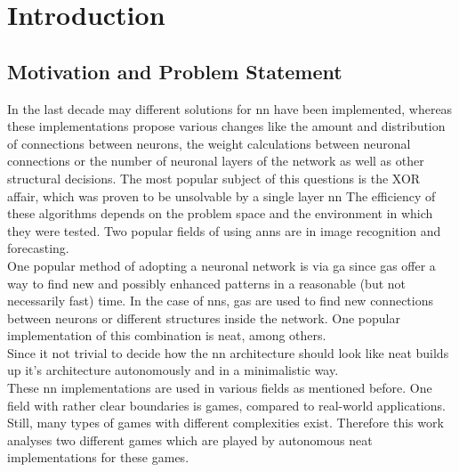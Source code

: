 %
\chapter{Introduction}
\label{sec:intro}


\section{Motivation and Problem Statement}
\label{sec:intro:motivation}
In the last decade may different solutions for \gls{nn} have been implemented, whereas these implementations propose various changes like the amount and distribution of connections between neurons, the weight calculations between neuronal connections or the number of neuronal layers of the network as well as other structural decisions. The most popular subject of this questions is the XOR affair, which was proven to be unsolvable by a single layer \gls{nn}\cite{newell_perceptrons._1969}
The efficiency of these algorithms depends on the problem space and the environment in which they were tested. Two popular fields of using \gls{ann}s are in image recognition and forecasting.\cite{khandelwal_time_2015, mehdy_artificial_2017}\\
One popular method of adopting a neuronal network is via \gls{ga} since \gls{ga}s offer a way to find new and possibly enhanced patterns in a reasonable (but not necessarily fast) time. In the case of \gls{nn}s, \gls{ga}s are used to find new connections between neurons or different structures inside the network. One popular implementation of this combination is \gls{neat}, among others.\cite{stanley_evolving_2002}\\
Since it not trivial to decide how the \gls{nn} architecture should look like \gls{neat} builds up it's architecture autonomously and in a minimalistic way.\\
These \gls{nn} implementations are used in various fields as mentioned before. One field with rather clear boundaries is games, compared to real-world applications. Still, many types of games with different complexities exist\cite{risi_neuroevolution_2014}. Therefore this work analyses two different games which are played by autonomous \gls{neat} implementations for these games.\\
